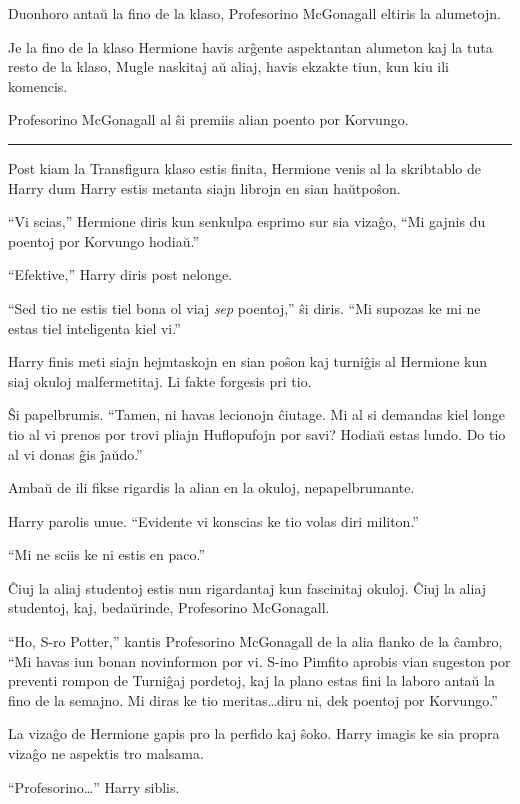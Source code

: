 Duonhoro antaŭ la fino de la klaso, Profesorino McGonagall eltiris la alumetojn.

Je la fino de la klaso Hermione havis arĝente aspektantan alumeton kaj
la tuta resto de la klaso, Mugle naskitaj aŭ aliaj, havis ekzakte
tiun, kun kiu ili komencis.

Profesorino McGonagall al ŝi premiis alian poento por Korvungo.

\begin{center}\rule{3in}{0.4pt}\end{center}

Post kiam la Transfigura klaso estis finita, Hermione venis al la
skribtablo de Harry dum Harry estis metanta siajn librojn en sian
haŭtpoŝon.

``Vi scias,'' Hermione diris kun senkulpa esprimo sur sia vizaĝo, ``Mi
gajnis du poentoj por Korvungo hodiaŭ.''

``Efektive,'' Harry diris post nelonge.

``Sed tio ne estis tiel bona ol viaj \emph{sep} poentoj,'' ŝi
diris. ``Mi supozas ke mi ne estas tiel inteligenta kiel vi.''

Harry finis meti siajn hejmtaskojn en sian poŝon kaj turniĝis al
Hermione kun siaj okuloj malfermetitaj. Li fakte forgesis pri tio.

Ŝi papelbrumis. ``Tamen, ni havas lecionojn ĉiutage. Mi al si demandas
kiel longe tio al vi prenos por trovi pliajn Huflopufojn por savi?
Hodiaŭ estas lundo. Do tio al vi donas ĝis ĵaŭdo.''

Ambaŭ de ili fikse rigardis la alian en la okuloj, nepapelbrumante.

Harry parolis unue. ``Evidente vi konscias ke tio volas diri militon.''

``Mi ne sciis ke ni estis en paco.''

Ĉiuj la aliaj studentoj estis nun rigardantaj kun fascinitaj
okuloj. Ĉiuj la aliaj studentoj, kaj, bedaŭrinde, Profesorino
McGonagall.

``Ho, S-ro Potter,'' kantis Profesorino McGonagall de la alia flanko
de la ĉambro, ``Mi havas iun bonan novinformon por vi. S-ino Pimfito
aprobis vian sugeston por preventi rompon de Turniĝaj pordetoj, kaj la
plano estas fini la laboro antaŭ la fino de la semajno. Mi diras ke
tio meritas\ldots diru ni, dek poentoj por Korvungo.''

La vizaĝo de Hermione gapis pro la perfido kaj ŝoko. Harry imagis ke
sia propra vizaĝo ne aspektis tro malsama.

``Profesorino\ldots'' Harry siblis.

